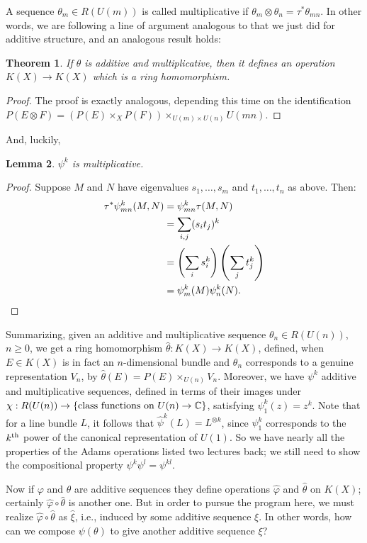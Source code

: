 \documentclass{article}
\newcommand{\C}{\mathbb{C}}
\newtheorem{thm}{Theorem}[section]
\newtheorem{lem}[thm]{Lemma}
\begin{document}
A sequence $\theta_m \in R(U(m))$ is called multiplicative if $\theta_m \otimes \theta_n = \tau^* \theta_{mn}$.  In other words, we are following a line of argument analogous to that we just did for additive structure, and an analogous result holds:
\begin{thm}
If $\theta$ is additive and multiplicative, then it defines an operation $K(X) \to K(X)$ which is a ring homomorphism.
\end{thm}
\begin{proof}
The proof is exactly analogous, depending this time on the identification $P(E \otimes F) = (P(E) \times_X P(F)) \times_{U(m) \times U(n)} U(mn)$.
\end{proof}

And, luckily,
\begin{lem}
$\psi^k$ is multiplicative.
\end{lem}
\begin{proof}Suppose $M$ and $N$ have eigenvalues $s_1, \ldots, s_m$ and $t_1, \ldots, t_n$ as above. Then:
\begin{align*}
\tau^* \psi^k_{mn}(M, N) & = \psi^k_{mn} \tau(M, N) \\
& = \sum_{i, j}(s_i t_j)^k \\
& = \left( \sum_i s_i^k \right) \left( \sum_j t_j^k \right) \\
& = \psi^k_m(M) \psi^k_n(N).\qedhere
\end{align*}
\end{proof}

Summarizing, given an additive and multiplicative sequence $\theta_n \in R(U(n))$, $n \ge 0$, we get a ring homomorphism $\hat \theta: K(X) \to K(X)$, defined, when $E \in K(X)$ is in fact an $n$-dimensional bundle and $\theta_n$ corresponds to a genuine representation $V_n$, by $\hat \theta(E) = P(E) \times_{U(n)} V_n$.  Moreover, we have $\psi^k$ additive and multiplicative sequences, defined in terms of their images under $\chi: R(U(n)) \to \{\hbox{class functions on $U(n) \to \C$}\}$, satisfying $\psi^k_1(z) = z^k$.  Note that for a line bundle $L$, it follows that $\hat \psi^k(L) = L^{\otimes k}$, since $\psi^k_1$ corresponds to the $k^\textup{th}$ power of the canonical representation of $U(1)$.  So we have nearly all the properties of the Adams operations listed two lectures back; we still need to show the compositional property $\psi^k \psi^l = \psi^{kl}$.

Now if $\varphi$ and $\theta$ are additive sequences they define operations $\hat \varphi$ and $\hat \theta$ on $K(X)$; certainly $\hat \varphi \circ \hat \theta$ is another one.  But in order to pursue the program here, we must realize $\hat \varphi \circ \hat \theta$ as $\hat \xi$, i.e., induced by some additive sequence $\xi$.  In other words, how can we compose $\psi (\theta)$ to give another additive sequence $\xi$?
\end{document}
